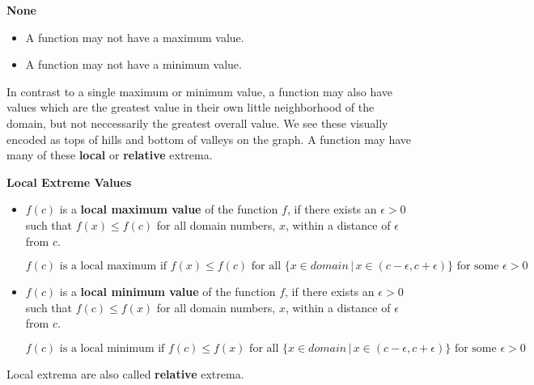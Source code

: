 \documentclass{ximera}
\begin{document}
\begin{warning} \textbf{\textcolor{red!70!black}{None}}

\begin{itemize}
\item A function may not have a maximum value. 
\item A function may not have a minimum value.
\end{itemize}

\end{warning}

















In contrast to a single maximum or minimum value, a function may also have values which are the greatest value in their own little neighborhood of the domain, but not neccessarily the greatest overall value.  We see these visually encoded as tops of hills and bottom of valleys on the graph.  A function may have many of these \textbf{local} or \textbf{relative} extrema.






\begin{definition} \textbf{\textcolor{green!50!black}{Local Extreme Values}} 
\begin{itemize}
\item $f(c)$ is a \textbf{local maximum value} of the function $f$, if there exists an $\epsilon > 0$ such that $f(x) \leq f(c)$ for all domain numbers, $x$, within a distance of $\epsilon$ from $c$. 

\[  f(c) \text{ is a local maximum if } f(x) \leq f(c) \text{ for all } \{ x \in domain \, | \, x \in (c - \epsilon, c + \epsilon) \} \text{ for some } \epsilon > 0 \]







\item $f(c)$ is a \textbf{local minimum value} of the function $f$, if there exists an $\epsilon > 0$ such that $f(c) \leq f(x)$ for all domain numbers, $x$, within a distance of $\epsilon$ from $c$. 



\[  f(c) \text{ is a local minimum if } f(c) \leq f(x) \text{ for all } \{ x \in domain \, | \, x \in (c - \epsilon, c + \epsilon) \} \text{ for some } \epsilon > 0 \]
\end{itemize}

Local extrema are also called \textbf{relative} extrema.

\end{definition}
\end{document}
